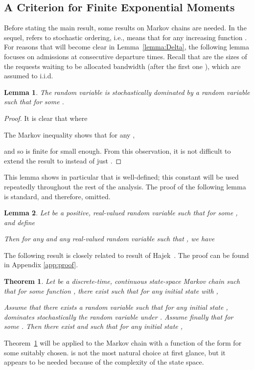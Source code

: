 \documentclass{amsart}
\newtheorem{theorem}{Theorem}
\newtheorem{lemma}{Lemma}
\begin{document}
\subsection*{A Criterion for Finite Exponential Moments}
Before stating the main result, some  results on Markov chains are
needed. In the sequel,  refers to stochastic ordering,
i.e.,  means that  for any
increasing function . For reasons that will become clear in Lemma~\ref{lemma:Delta},
the following lemma focuses on admissions at  consecutive departure
times. Recall that  are the sizes of the requests waiting to be allocated bandwidth (after the first one ), which are assumed to i.i.d.
\begin{lemma}\label{lemma:coupling}
    The random variable  is stochastically dominated by a random
    variable  such that  for some .
\end{lemma}
\begin{proof}
It is clear that  where
    
The Markov inequality shows that for any ,
 
and so  is finite for  small enough. From
this observation, it is not difficult to extend the result to
 instead of just
    .
\end{proof}
This lemma shows in particular that
 is well-defined; this
constant will be used repeatedly throughout the rest of the
analysis. The proof of the following lemma is standard, and therefore,
omitted.
\begin{lemma} \label{lemma}
Let  be a positive, real-valued random variable such that
 for some , and define
    
Then for any  and any real-valued
random variable  such that , we have
    
\end{lemma}
The following result is closely related to result of
Hajek~\cite{Hajek82:0}. The proof can be found in Appendix \ref{app:proof}.
\begin{theorem} \label{thm:hajek}
Let  be a discrete-time, continuous state-space Markov chain
such that for some function , there exist 
such that for any initial state  with ,
    
Assume that there exists a random variable  such that for any
initial state ,  dominates stochastically the random variable
 under . Assume finally that  for some . Then there exist 
and  such that for any initial state ,

\end{theorem}
Theorem~\ref{thm:hajek} will be applied to the Markov chain
 with a function  of the form  for some  suitably chosen.  is not the most natural choice
at first glance, but it appears to be needed because of the
complexity of the state space.
\end{document}
